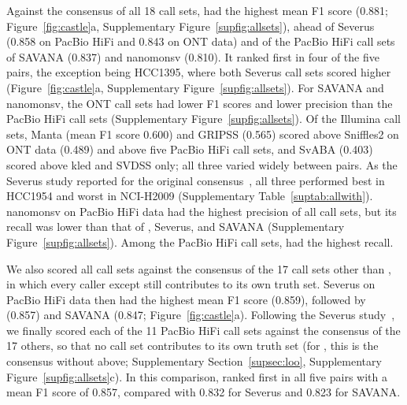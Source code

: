 Against the consensus of all 18 call sets, \tool{} had the highest mean F1 score (0.881; Figure~\ref{fig:castle}a, Supplementary Figure~\ref{supfig:allsets}), ahead of Severus (0.858 on PacBio HiFi and 0.843 on ONT data) and of the PacBio HiFi call sets of SAVANA (0.837) and nanomonsv (0.810).
It ranked first in four of the five pairs, the exception being HCC1395, where both Severus call sets scored higher (Figure~\ref{fig:castle}a, Supplementary Figure~\ref{supfig:allsets}).
For SAVANA and nanomonsv, the ONT call sets had lower F1 scores and lower precision than the PacBio HiFi call sets (Supplementary Figure~\ref{supfig:allsets}).
Of the Illumina call sets, Manta (mean F1 score 0.600) and GRIPSS (0.565) scored above Sniffles2 on ONT data (0.489) and above five PacBio HiFi call sets, and SvABA (0.403) scored above kled and SVDSS only; all three varied widely between pairs.
As the Severus study reported for the original consensus~\cite{severus}, all three performed best in HCC1954 and worst in NCI-H2009 (Supplementary Table~\ref{suptab:allwith}).
nanomonsv on PacBio HiFi data had the highest precision of all call sets, but its recall was lower than that of \tool{}, Severus, and SAVANA (Supplementary Figure~\ref{supfig:allsets}).
Among the PacBio HiFi call sets, \tool{} had the highest recall.

We also scored all call sets against the consensus of the 17 call sets other than \tool{}, in which every caller except \tool{} still contributes to its own truth set.
Severus on PacBio HiFi data then had the highest mean F1 score (0.859), followed by \tool{} (0.857) and SAVANA (0.847; Figure~\ref{fig:castle}a).
Following the Severus study~\cite{severus}, we finally scored each of the 11 PacBio HiFi call sets against the consensus of the 17 others, so that no call set contributes to its own truth set (for \tool{}, this is the consensus without \tool{} above; Supplementary Section~\ref{supsec:loo}, Supplementary Figure~\ref{supfig:allsets}c).
In this comparison, \tool{} ranked first in all five pairs with a mean F1 score of 0.857, compared with 0.832 for Severus and 0.823 for SAVANA.

